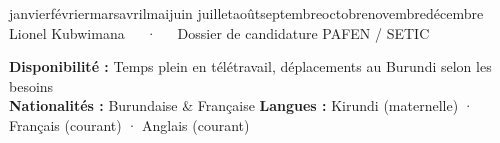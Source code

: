 \documentclass[11pt, a4paper]{../../awesome-cv}
\newcommand{\cvtoday}{%
  \number\day\space
  \ifcase\month\or janvier\or février\or mars\or avril\or mai\or juin\or
  juillet\or août\or septembre\or octobre\or novembre\or décembre\fi\space
  \number\year
}
\renewenvironment{cvparagraph}{%
  \vspace{0.5mm}%
  \paragraphstyle
}{%
  \par\vspace{0.5mm}%
}
\begin{document}
\makecvheader[C]

\makecvfooter
  {\cvtoday}
  {Lionel Kubwimana~~~·~~~Dossier de candidature PAFEN / SETIC}
  {\thepage}

\begin{cvparagraph}
\begin{center}
  \textbf{Disponibilité :} Temps plein en télétravail, déplacements au Burundi selon les besoins \\[3pt]
  \textbf{Nationalités :} Burundaise \& Française \quad\textbar\quad
  \textbf{Langues :} Kirundi (maternelle) · Français (courant) · Anglais (courant)
\end{center}
\end{cvparagraph}










\end{document}
